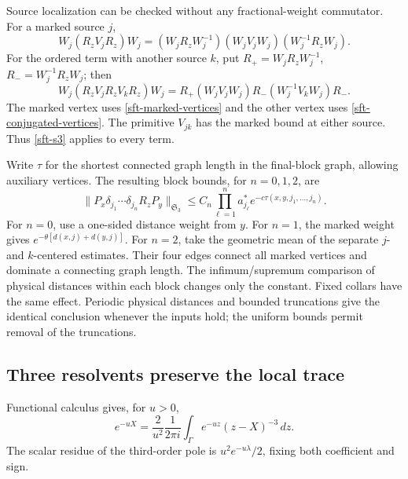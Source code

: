 \documentclass[11pt]{article}
\theoremstyle{remark}
\begin{document}
Source localization can be checked without any fractional-weight
commutator. For a marked source \(j\),
\begin{equation}
 W_j(R_zV_jR_z)W_j
 =(W_jR_zW_j^{-1})(W_jV_jW_j)(W_j^{-1}R_zW_j).
 \label{sft-marked-first}
\end{equation}
For the ordered term with another source \(k\), put
\(R_+=W_jR_zW_j^{-1}\), \(R_-=W_j^{-1}R_zW_j\); then
\begin{equation}
 W_j(R_zV_jR_zV_kR_z)W_j
 =R_+(W_jV_jW_j)R_-(W_j^{-1}V_kW_j)R_-.
 \label{sft-marked-second}
\end{equation}
The marked vertex uses \eqref{sft-marked-vertices} and the other
vertex uses \eqref{sft-conjugated-vertices}. The primitive
\(V_{jk}\) has the marked bound at either source. Thus
\eqref{sft-s3} applies to every term.

Write \(\tau\) for the shortest connected graph length in the
final-block graph, allowing auxiliary vertices. The resulting
block bounds, for \(n=0,1,2\), are
\begin{equation}
 \|P_x\delta_{j_1}\cdots\delta_{j_n}R_zP_y\|_{\mathfrak S_3}
 \le C_n\prod_{\ell=1}^n a_{j_\ell}^*
       e^{-c\tau(x,y,j_1,\ldots,j_n)}.
 \label{sft-rooted-resolvent}
\end{equation}
For \(n=0\), use a one-sided distance weight from \(y\).
For \(n=1\), the marked weight gives
\(e^{-\theta[d(x,j)+d(y,j)]}\). For \(n=2\), take the
geometric mean of the separate \(j\)- and \(k\)-centered estimates.
Their four edges connect all marked vertices and dominate a
connecting graph length. The infimum/supremum comparison of
physical distances within each block changes only the constant.
Fixed collars have the same effect. Periodic physical distances
and bounded truncations give the identical conclusion whenever the
inputs hold; the uniform bounds permit removal of the truncations.

\subsection{Three resolvents preserve the local trace}
\label{sft-heat-section}

Functional calculus gives, for \(u>0\),
\begin{equation}
 e^{-uX}=\frac{2}{u^2}\frac1{2\pi i}
       \int_\Gamma e^{-uz}(z-X)^{-3}\,dz .
 \label{sft-cubic-calculus}
\end{equation}
The scalar residue of the third-order pole is
\(u^2e^{-u\lambda}/2\), fixing both coefficient and sign.
\end{document}
